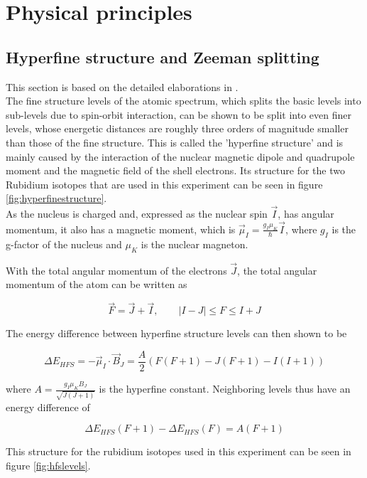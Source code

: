 \section{Physical principles}
\subsection{Hyperfine structure and Zeeman splitting}
This section is based on the detailed elaborations in \cite{staatsex}.\\
The fine structure levels of the atomic spectrum, which splits the basic levels into sub-levels due to spin-orbit interaction, can be shown to be split into even finer levels, whose energetic distances are roughly three orders of magnitude smaller than those of the fine structure. This is called the 'hyperfine structure' and is mainly caused by the interaction of the nuclear magnetic dipole and quadrupole moment and the magnetic field of the shell electrons. Its structure for the two Rubidium isotopes that are used in this experiment can be seen in figure \ref{fig:hyperfinestructure}.\\

As the nucleus is charged and, expressed as the nuclear spin $\vec{I}$, has angular momentum, it also has a magnetic moment, which is $\vec{\mu}_I=\frac{g_I\mu_K}{\hbar}\vec{I}$, where $g_I$ is the g-factor of the nucleus and $\mu_K$ is the nuclear magneton. 

With the total angular momentum of the electrons $\vec{J}$, the total angular momentum of the atom can be written as

\begin{equation}
\vec{F}=\vec{J}+\vec{I},\qquad \lvert I-J\rvert\le F \le I+J
\end{equation}

The energy difference between hyperfine structure levels can then shown to be

\begin{equation}
\Delta E_{HFS}=-\vec{\mu}_I\cdot\vec{B}_J=\frac{A}{2}(F(F+1)-J(F+1)-I(I+1))
\end{equation}

where $A=\frac{g_I\mu_KB_J}{\sqrt{J(J+1)}}$ is the hyperfine constant. Neighboring levels thus have an energy difference of

\begin{equation}
\Delta E_{HFS}(F+1)-\Delta E_{HFS}(F)=A(F+1)
\label{eq:hfslevels}
\end{equation}

This structure for the rubidium isotopes used in this experiment can be seen in figure \ref{fig:hfslevels}.\\


